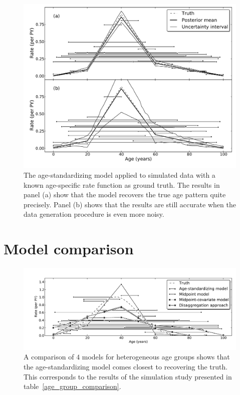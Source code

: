 \begin{figure}[h]
\begin{center}
\includegraphics[width=\textwidth]{age_group_standardize.pdf}
\caption[The age-standardizing model applied to simulated data.]{The 
  age-standardizing model applied to simulated data with a
  known age-specific rate function as ground truth.  The results in
  panel (a) show that the model
  recovers the true age pattern quite precisely. Panel (b) shows that the
  results are still accurate when the data generation procedure is
  even more noisy.}
\label{age-group-standardize}
\end{center}
\end{figure}


\section{Model comparison}
\label{agm-compare}

\begin{figure}[h]
\begin{center}
\includegraphics[width=\textwidth]{age_group_models.pdf}
\caption[A comparison of $4$ models for heterogeneous age groups.]{A 
  comparison of $4$ models for heterogeneous age groups shows that the 
  age-standardizing model comes closest to recovering the truth.  This 
  corresponds to the results of the simulation study presented in table~\ref{age_group_comparison}.}
\label{age-group-model-comparison}
\end{center}
\end{figure}


